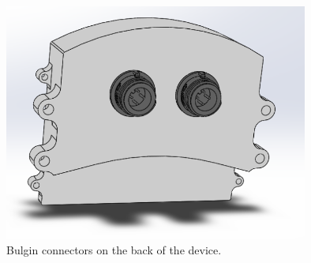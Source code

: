 \begin{figure}[H]
\begin{center}
\includegraphics[width=10cm]{Figures/device_back.png}
\end{center}
\caption{Bulgin connectors on the back of the device.}
\label{fig:device_back}
\end{figure}

